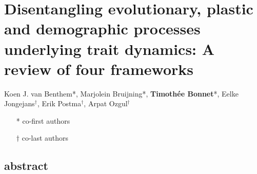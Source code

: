 \chapter[Evolution or plasticity?]{Disentangling evolutionary, plastic and demographic processes underlying trait dynamics: A review of four frameworks}

Koen J. van Benthem*, Marjolein Bruijning*, \textbf{Timoth\'ee Bonnet}*, Eelke Jongejans$^\dagger$,
Erik Postma$^\dagger$, Arpat Ozgul$^\dagger$
\begin{itemize}
\item[*] co-first authors
\item[$\dagger$] co-last authors
\end{itemize}

\section{abstract}
